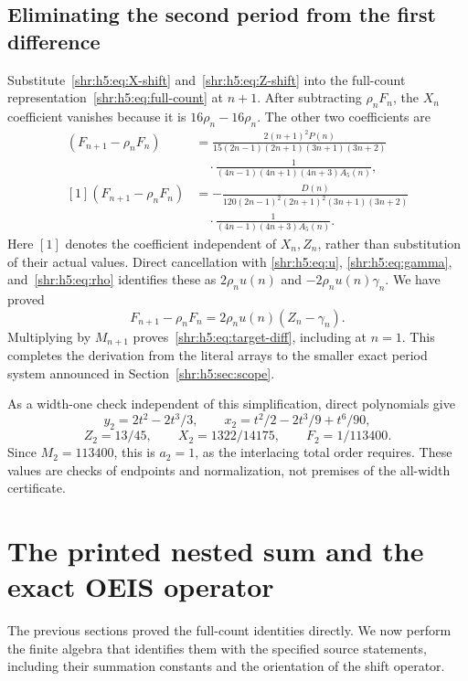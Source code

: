 \documentclass[11pt,letterpaper]{article}
\numberwithin{equation}{section}
\theoremstyle{definition}
\newcommand{\1}{\mathbf 1}
\begin{document}
\subsection{Eliminating the second period from the first difference}
Substitute~\eqref{shr:h5:eq:X-shift} and~\eqref{shr:h5:eq:Z-shift} into the
full-count representation~\eqref{shr:h5:eq:full-count} at $n+1$.
After subtracting $\rho_nF_n$, the $X_n$ coefficient vanishes because it
is $16\rho_n-16\rho_n$. The other two coefficients are
\begin{align}
 [Z_n](F_{n+1}-\rho_nF_n)
   &=\frac{2(n+1)^2P(n)}
 {15(2n-1)(2n+1)(3n+1)(3n+2)}\\
 &\hspace{1em}\cdot
 \frac1{(4n-1)(4n+1)(4n+3)A_5(n)},
 \label{shr:h5:eq:diff-Z}\\
 [1](F_{n+1}-\rho_nF_n)
   &=-\frac{D(n)}
 {120(2n-1)^2(2n+1)^2(3n+1)(3n+2)}\\
 &\hspace{1em}\cdot\frac1{(4n-1)(4n+3)A_5(n)}.
 \label{shr:h5:eq:diff-constant}
\end{align}
Here $[1]$ denotes the coefficient independent of $X_n,Z_n$, rather than
substitution of their actual values. Direct cancellation with
\eqref{shr:h5:eq:u}, \eqref{shr:h5:eq:gamma}, and~\eqref{shr:h5:eq:rho} identifies these
as $2\rho_nu(n)$ and $-2\rho_nu(n)\gamma_n$. We have proved
\begin{equation}
 F_{n+1}-\rho_nF_n=2\rho_nu(n)(Z_n-\gamma_n).
 \label{shr:h5:eq:F-first-difference}
\end{equation}
Multiplying by $M_{n+1}$ proves~\eqref{shr:h5:eq:target-diff}, including at
$n=1$. This completes the derivation from the literal arrays to the
smaller exact period system announced in Section~\ref{shr:h5:sec:scope}.

As a width-one check independent of this simplification, direct
polynomials give
\[
 y_2=2t^2-2t^3/3,\qquad
 x_2=t^2/2-2t^3/9+t^6/90,
\]
\[
 Z_2=13/45,\qquad X_2=1322/14175,
 \qquad F_2=1/113400.
\]
Since $M_2=113400$, this is $a_2=1$, as the interlacing total order
requires. These values are checks of endpoints and normalization, not
premises of the all-width certificate.

\section{The printed nested sum and the exact OEIS operator}
\label{shr:h5:sec:sum-operator}
The previous sections proved the full-count identities directly. We now
perform the finite algebra that identifies them with the specified source
statements, including their summation constants and the orientation of
the shift operator.
\end{document}
